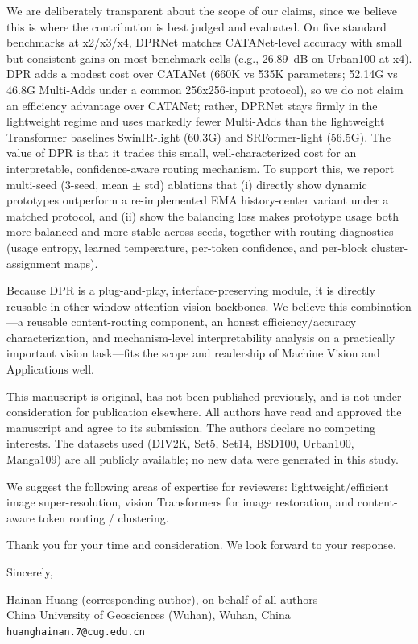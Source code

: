 \documentclass[11pt]{article}
\begin{document}
We are deliberately transparent about the scope of our claims, since we believe this is
where the contribution is best judged and evaluated. On five standard benchmarks at
x2/x3/x4, DPRNet matches CATANet-level accuracy with small but consistent gains on most
benchmark cells (e.g., 26.89~dB on Urban100 at x4). DPR adds a modest cost over CATANet
(660K vs 535K parameters; 52.14G vs 46.8G Multi-Adds under a common 256x256-input
protocol), so we do not claim an efficiency advantage over CATANet; rather, DPRNet stays
firmly in the lightweight regime and uses markedly fewer Multi-Adds than the lightweight
Transformer baselines SwinIR-light (60.3G) and SRFormer-light (56.5G). The value of DPR is
that it trades this small, well-characterized cost for an interpretable, confidence-aware
routing mechanism. To support this, we report multi-seed (3-seed, mean $\pm$ std) ablations
that (i) directly show dynamic prototypes outperform a re-implemented EMA history-center
variant under a matched protocol, and (ii) show the balancing loss makes prototype usage
both more balanced and more stable across seeds, together with routing diagnostics (usage
entropy, learned temperature, per-token confidence, and per-block cluster-assignment maps).

Because DPR is a plug-and-play, interface-preserving module, it is directly reusable in
other window-attention vision backbones. We believe this combination---a reusable
content-routing component, an honest efficiency/accuracy characterization, and
mechanism-level interpretability analysis on a practically important vision task---fits the
scope and readership of Machine Vision and Applications well.

This manuscript is original, has not been published previously, and is not under
consideration for publication elsewhere. All authors have read and approved the manuscript
and agree to its submission. The authors declare no competing interests. The datasets used
(DIV2K, Set5, Set14, BSD100, Urban100, Manga109) are all publicly available; no new data
were generated in this study.

We suggest the following areas of expertise for reviewers: lightweight/efficient image
super-resolution, vision Transformers for image restoration, and content-aware token
routing / clustering.

Thank you for your time and consideration. We look forward to your response.

\medskip
\noindent Sincerely,

\medskip
\noindent Hainan Huang (corresponding author), on behalf of all authors \\
China University of Geosciences (Wuhan), Wuhan, China \\
\texttt{huanghainan.7@cug.edu.cn}
\end{document}
